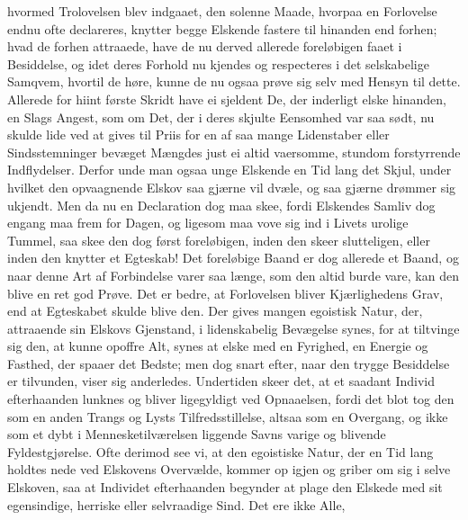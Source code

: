 \documentclass[12pt,a4paper]{book}
\newcommand{\apage}[1]{\marginnote{\footnotesize\textit{[#1]}}}
\begin{document}
hvormed Trolovelsen blev indgaaet, den solenne Maade, hvorpaa en
Forlovelse endnu ofte declareres, knytter begge Elskende fastere til
hinanden end forhen; hvad de forhen attraaede, have de nu derved
allerede foreløbigen faaet i Besiddelse, og idet deres Forhold nu
kjendes og respecteres i det selskabelige Samqvem, hvortil de høre,
kunne de nu ogsaa prøve sig selv med Hensyn til dette. Allerede for
hiint første Skridt have ei sjeldent De, der inderligt elske hinanden,
en Slags Angest, som om Det, der i deres skjulte Eensomhed var saa sødt,
nu skulde lide ved at gives til Priis for en af saa mange Lidenstaber
eller Sindsstemninger bevæget Mængdes just ei altid vaersomme, stundom
forstyrrende Indflydelser. Derfor unde man ogsaa unge Elskende en Tid
lang det Skjul, under hvilket den opvaagnende Elskov saa gjærne vil
dvæle, og saa gjærne drømmer sig ukjendt. Men da nu en Declaration dog
maa skee, fordi Elskendes \apage{84} Samliv dog engang maa frem for Dagen, og
ligesom maa vove sig ind i Livets urolige Tummel, saa skee den dog først
foreløbigen, inden den skeer slutteligen, eller inden den knytter et
Egteskab! Det foreløbige Baand er dog allerede et Baand, og naar denne
Art af Forbindelse varer saa længe, som den altid burde vare, kan den
blive en ret god Prøve. Det er bedre, at Forlovelsen bliver
Kjærlighedens Grav, end at Egteskabet skulde blive den.
Der gives mangen egoistisk Natur, der, attraaende sin Elskovs
Gjenstand, i lidenskabelig Bevægelse synes, for at tiltvinge sig den, at
kunne opoffre Alt, synes at elske med en Fyrighed, en Energie og
Fasthed, der spaaer det Bedste; men dog snart efter, naar den trygge
Besiddelse er tilvunden, viser sig anderledes. Undertiden skeer det, at
et saadant Individ efterhaanden lunknes og bliver ligegyldigt ved
Opnaaelsen, fordi det blot tog den som en anden Trangs og Lysts
Tilfredsstillelse, altsaa som en Overgang, og ikke som et dybt i
Mennesketilværelsen liggende Savns varige og blivende Fyldestgjørelse.
Ofte derimod see vi, at den egoistiske Natur, der en Tid lang holdtes
nede ved Elskovens Overvælde, kommer op igjen og griber om sig i selve
Elskoven, saa at Individet efterhaanden begynder at plage den Elskede
med sit egensindige, herriske eller selvraadige Sind. Det ere ikke Alle,
\end{document}
